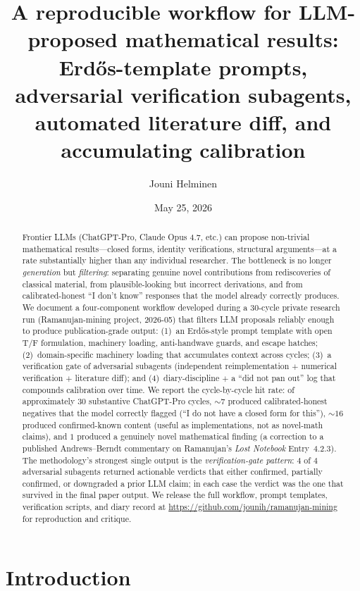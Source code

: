 \documentclass[11pt,reqno]{amsart}
\title{A reproducible workflow for LLM-proposed mathematical results:
Erd\H{o}s-template prompts, adversarial verification subagents,
automated literature diff, and accumulating calibration}
\author{Jouni Helminen}
\date{May 25, 2026}
\theoremstyle{definition}
\begin{document}
\begin{abstract}
Frontier LLMs (ChatGPT-Pro, Claude Opus 4.7, etc.) can propose
non-trivial mathematical results---closed forms, identity
verifications, structural arguments---at a rate substantially higher
than any individual researcher. The bottleneck is no longer
\emph{generation} but \emph{filtering}: separating genuine novel
contributions from rediscoveries of classical material, from
plausible-looking but incorrect derivations, and from
calibrated-honest ``I don't know'' responses that the model already
correctly produces. We document a four-component workflow developed
during a 30-cycle private research run (Ramanujan-mining project,
2026-05) that filters LLM proposals reliably enough to produce
publication-grade output: (1)~an Erd\H{o}s-style prompt template with
open T/F formulation, machinery loading, anti-handwave guards, and
escape hatches; (2)~domain-specific machinery loading that
accumulates context across cycles; (3)~a verification gate of
adversarial subagents (independent reimplementation $+$ numerical
verification $+$ literature diff); and (4)~diary-discipline $+$ a
``did not pan out'' log that compounds calibration over time. We
report the cycle-by-cycle hit rate: of approximately $30$ substantive
ChatGPT-Pro cycles, $\sim 7$ produced calibrated-honest negatives
that the model correctly flagged (``I do not have a closed form for
this''), $\sim 16$ produced confirmed-known content (useful as
implementations, not as novel-math claims), and $1$ produced a
genuinely novel mathematical finding (a correction to a published
Andrews--Berndt commentary on Ramanujan's \emph{Lost Notebook}
Entry~4.2.3). The methodology's strongest single output is the
\emph{verification-gate pattern}: $4$ of $4$ adversarial subagents
returned actionable verdicts that either confirmed, partially
confirmed, or downgraded a prior LLM claim; in each case the verdict
was the one that survived in the final paper output. We release the
full workflow, prompt templates, verification scripts, and diary
record at \url{https://github.com/jounih/ramanujan-mining} for
reproduction and critique.
\end{abstract}

\maketitle

\section{Introduction}\label{sec:intro}
\end{document}
